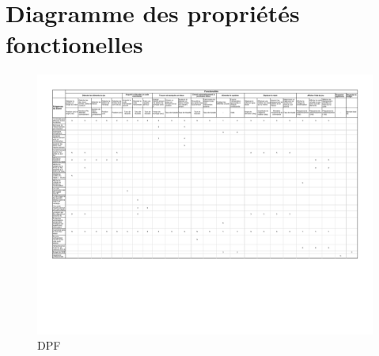 \chapter{Diagramme des propriétés fonctionelles}

\begin{landscape}
\begin{figure}[h]
  \centering
  \caption{DPF}
  \includegraphics[scale=0.85]{resources/dpf.pdf}
\end{figure}
\end{landscape}
